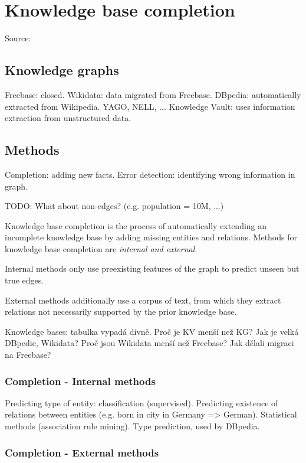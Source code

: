 \chapter{Knowledge base completion}

Source: \cite{kg-refinement-survey}

\section{Knowledge graphs}

Freebase: closed. Wikidata: data migrated from Freebase.
DBpedia: automatically extracted from Wikipedia.
YAGO, NELL, ...
Knowledge Vault: uses information extraction from unstructured data.

\section{Methods}

Completion: adding new facts.
Error detection: identifying wrong information in graph.

TODO: What about non-edges? (e.g. population = 10M, ...)

Knowledge base completion is the process of automatically extending an
incomplete knowledge base by adding missing entities and relations.
Methods for knowledge base completion are \em{internal} and \em{external}.

Internal methods only use preexisting features of the graph to predict unseen
but true edges.

External methods additionally use a corpus of text, from which they extract
relations not necessarily supported by the prior knowledge base.

Knowledge bases: tabulka vypadá divně. Proč je KV menší než KG?
Jak je velká DBpedie, Wikidata? Proč jsou Wikidata menší než Freebase?
Jak dělali migraci na Freebase?

\subsection{Completion - Internal methods}

Predicting type of entity: classification (supervised).
Predicting existence of relations between entities (e.g. born in city in Germany
=> German).
Statistical methods (association rule mining). Type prediction, used by DBpedia.

\subsection{Completion - External methods}

